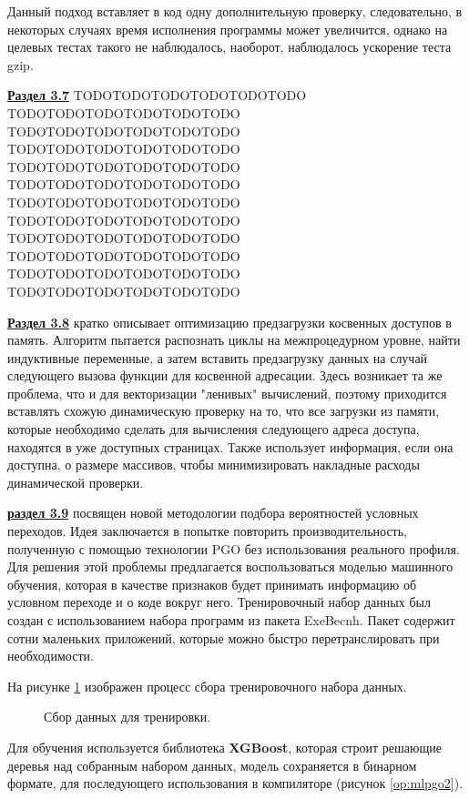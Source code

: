  Данный подход вставляет в код одну дополнительную проверку, следовательно,
 в некоторых случаях время исполнения программы может увеличится,
 однако на целевых тестах такого не наблюдалось, наоборот, наблюдалось ускорение
 теста gzip.
 
  \underline{\textbf{Раздел 3.7}} 
  TODOTODOTODOTODOTODOTODO TODOTODOTODOTODOTODOTODO TODOTODOTODOTODOTODOTODO TODOTODOTODOTODOTODOTODO TODOTODOTODOTODOTODOTODO TODOTODOTODOTODOTODOTODO TODOTODOTODOTODOTODOTODO TODOTODOTODOTODOTODOTODO TODOTODOTODOTODOTODOTODO TODOTODOTODOTODOTODOTODO TODOTODOTODOTODOTODOTODO TODOTODOTODOTODOTODOTODO
 
 \underline{\textbf{Раздел 3.8}} кратко описывает оптимизацию предзагрузки косвенных доступов в память. Алгоритм пытается распознать циклы на межпроцедурном уровне, найти индуктивные переменные, а затем вставить предзагрузку данных на случай следующего вызова функции для косвенной адресации. Здесь возникает та же проблема, что и для векторизации "ленивых"\phantom{ } вычислений, поэтому приходится вставлять схожую динамическую проверку на то, что все загрузки из памяти, которые необходимо сделать для вычисления следующего адреса доступа, находятся в уже доступных страницах. Также использует информация, если она доступна, о размере массивов, чтобы минимизировать накладные расходы динамической проверки.
 
  \underline{\textbf{раздел 3.9}} посвящен новой методологии подбора вероятностей условных переходов. Идея заключается в попытке повторить производительность, полученную с помощью технологии PGO без использования реального профиля. Для решения этой проблемы предлагается воспользоваться моделью машинного обучения, которая в качестве признаков будет принимать информацию об условном переходе и о коде вокруг него. Тренировочный набор данных был создан с использованием набора программ из пакета
  ExeBecnh. Пакет содержит сотни маленьких приложений, которые
  можно быстро перетранслировать при необходимости. 
  
  На рисунке \ref{op:mlpgo1} изображен процесс сбора тренировочного набора данных.
  \begin{figure}[htbp]
  	\centering
  	
  	\caption{Сбор данных для тренировки.}
  	\label{op:mlpgo1}
  \end{figure}
  
  Для обучения используется библиотека \textbf{XGBoost}, которая строит решающие деревья над собранным набором данных, модель сохраняется в бинарном формате, для последующего использования в компиляторе (рисунок \ref{op:mlpgo2}).
  
